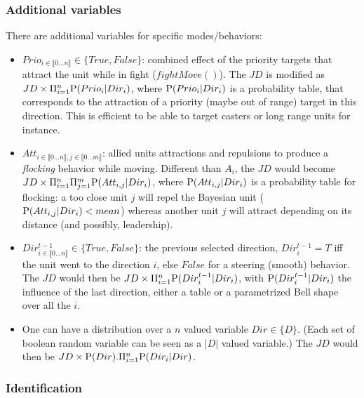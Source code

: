 \subsubsection{Additional variables}
There are additional variables for specific modes/behaviors:
\begin{itemize}
\item $Prio_{i \in \llbracket 0 \dots n\rrbracket } \in \{True, False\}$: combined effect of the priority targets that attract the unit while in fight ($fightMove()$). The $JD$ is modified as $JD \times \Pi_{i=1}^{n} \mathrm{P}(Prio_i | Dir_i)$, where $\mathrm{P}(Prio_i | Dir_i)$ is a probability table, that corresponds to the attraction of a priority (maybe out of range) target in this direction. This is efficient to be able to target casters or long range units for instance.

\item $Att_{i \in \llbracket 0 \dots n\rrbracket, j \in \llbracket 0 \dots m \rrbracket}$: allied units attractions and repulsions to produce a \textit{flocking} behavior while moving. Different than $A_i$, the $JD$ would become $JD \times \Pi_{i=1}^{n} \Pi_{j=1}^{m} \mathrm{P}(Att_{i,j} | Dir_i)$, where $\mathrm{P}(Att_{i,j} | Dir_i)$ is a probability table for flocking: a too close unit $j$ will repel the Bayesian unit ($\mathrm{P}(Att_{i,j} | Dir_i) < mean$) whereas another unit $j$ will attract depending on its distance (and possibly, leadership).

\item $Dir_{i \in \llbracket 0 \dots n\rrbracket }^{t-1} \in \{True, False\}$: the previous selected direction, $Dir_i^{t-1} = T$ iff the unit went to the direction $i$, else $False$ for a steering (smooth) behavior. The $JD$ would then be $JD \times \Pi_{i=1}^{n} \mathrm{P}(Dir_i^{t-1} | Dir_i)$, with $\mathrm{P}(Dir_i^{t-1} | Dir_i)$ the influence of the last direction, either a table or a parametrized Bell shape over all the $i$.

\item One can have a distribution over a $n$ valued variable $Dir \in \{D\}$. (Each set of boolean random variable can be seen as a $|D|$ valued variable.) The $JD$ would then be $JD \times \mathrm{P}(Dir).\Pi_{i=1}^{n} \mathrm{P}(Dir_i | Dir)$.
\end{itemize}




\subsubsection{Identification}

